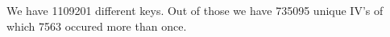 We have 1109201 different keys. Out of those we have 735095 unique IV's of which 7563 occured more than once.

